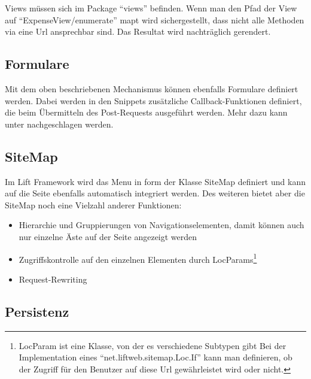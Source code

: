 Views m\"ussen sich im Package ``views'' befinden. Wenn man den Pfad der View auf  ``ExpenseView/enumerate''  mapt wird sichergestellt, dass nicht alle Methoden via eine Url ansprechbar sind. Das Resultat wird nachtr\"aglich gerendert.

\subsection{Formulare}
Mit dem oben beschriebenen Mechanismus k\"onnen ebenfalls Formulare definiert werden. Dabei werden in den Snippets zus\"atzliche Callback-Funktionen definiert, die beim \"Ubermitteln des Post-Requests ausgef\"uhrt werden. Mehr dazu kann unter  \cite[p. 47-58]{chen2009lift} nachgeschlagen werden.

\subsection{SiteMap \cite[p. 61-70]{chen2009lift}}\label{lift:sitemap}
Im Lift Framework wird das Menu in form der Klasse SiteMap definiert und kann auf die Seite ebenfalls automatisch integriert werden. Des weiteren bietet aber die SiteMap noch eine Vielzahl anderer Funktionen:
\begin{itemize}
\item Hierarchie und Gruppierungen von Navigationselementen, damit k\"onnen auch nur einzelne \"Aste auf der Seite angezeigt werden
\item Zugriffskontrolle auf den einzelnen Elementen durch LocParams\footnote{LocParam ist eine Klasse, von der es verschiedene Subtypen gibt Bei der Implementation eines ``net.liftweb.sitemap.Loc.If'' kann man definieren, ob der Zugriff f\"ur den Benutzer auf diese Url gew\"ahrleistet wird oder nicht. }
\item Request-Rewriting
\end{itemize}

\subsection{Persistenz}\label{grundlagen:persistenz}
